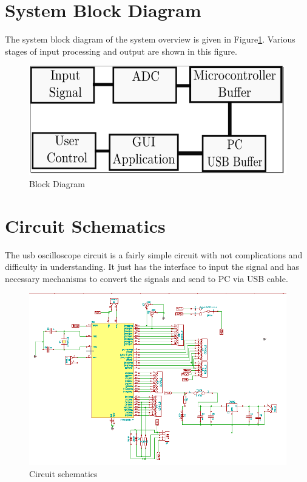\documentclass[12pt,a4paper]{article}
\begin{document}
\section{System Block Diagram}
	The system block diagram of the system overview is given in Figure\ref{fig:BlockDiagram}. Various stages of input processing and output are shown in this figure.
	\begin{figure}[hbtp]
		\centering
		\includegraphics[scale=.6]{Images/BlockDiagram.png}
		\caption{Block Diagram}
		\label{fig:BlockDiagram}
	\end{figure}


\section{Circuit Schematics}
The usb oscilloscope circuit is a fairly simple circuit with not complications and difficulty in understanding. It just has the interface to input the signal and has necessary mechanisms to convert the signals and send to PC via USB cable.

\begin{figure}[hbtp]
	\centering
	\includegraphics[scale=.4]{Images/CircuitTwoD.png}
	\caption{Circuit schematics }
\end{figure}
\end{document}
